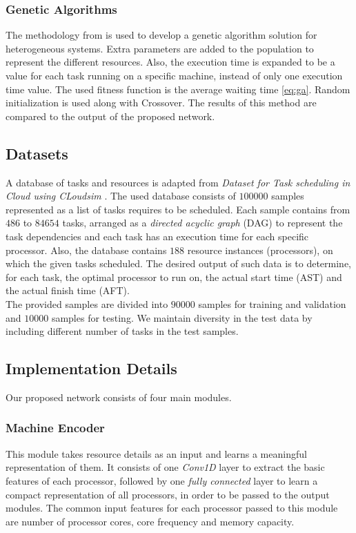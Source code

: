 \subsubsection{Genetic Algorithms}
The methodology from \cite{article2} is used to develop a genetic algorithm solution for heterogeneous systems. Extra parameters are added to the population to represent the different resources. Also, the execution time is expanded to be a value for each task running on a specific machine, instead of only one execution time value. The used fitness function is the average waiting time \ref{eq:ga}. Random initialization is used along with Crossover. The results of this method are compared to the output of the proposed network.

\subsection{Datasets}
A database of tasks and resources is adapted from \emph{Dataset for Task scheduling in Cloud using CLoudsim} \cite{px5b-b729-20}. The used database consists of $100000$ samples represented as a list of tasks requires to be scheduled. Each sample contains from $486$ to $84654$ tasks, arranged as a \emph{directed acyclic graph} (DAG) to represent the task dependencies and each task has an execution time for each specific processor. Also, the database contains $188$ resource instances (processors), on which the given tasks scheduled. The desired output of such data is to determine, for each task, the optimal processor to run on, the actual start time (AST) and the actual finish time (AFT). \\

The provided samples are divided into $90000$ samples for training and validation and $10000$  samples for testing. We maintain diversity in the test data by including different number of tasks in the test samples.

\subsection{Implementation Details}
Our proposed network consists of four main modules.

\subsubsection{Machine Encoder}
This module takes resource details as an input and learns a meaningful representation of them. It consists of one \emph{Conv1D} layer to extract the basic features of each processor, followed by one \emph{fully connected} layer to learn a compact representation of all processors, in order to be passed to the output modules. The common input features for each processor passed to this module are number of processor cores, core frequency and memory capacity. \\

